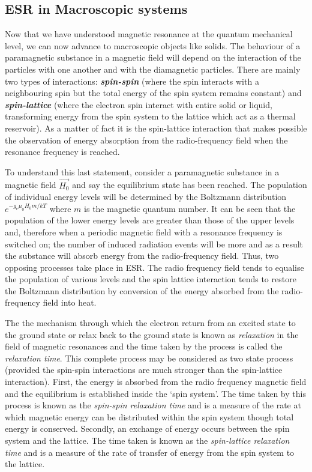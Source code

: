 \documentclass[%
 reprint,
nofootinbib,
 amsmath,amssymb,
 aps,
floatfix,
]{revtex4-2}
\begin{document}
    \subsection{ESR in Macroscopic systems}
    Now that we have understood magnetic resonance at the quantum mechanical level, we can now advance to macroscopic objects like solids. The behaviour of a paramagnetic substance in a magnetic field will depend on the interaction of the particles with one another and with the diamagnetic particles. There are mainly two types of interactions: \textbf{\textit{spin-spin}} (where the spin interacts with a neighbouring spin but the total energy of the spin system remains constant) and \textbf{\textit{spin-lattice}} (where the electron spin interact with entire solid or liquid, transforming energy from the spin system to the lattice which act as a thermal reservoir). As a matter of fact it is the spin-lattice interaction that makes possible the observation of energy absorption from the radio-frequency field when the resonance frequency is reached.
    \par
    To understand this last statement, consider a paramagnetic substance in a magnetic field $\Vec{H_0}$ and say the equilibrium state has been reached. The population of individual energy levels will be determined by the Boltzmann distribution $e^{-g_e \mu_0 H_0 m/ kT}$ where $m$ is the magnetic quantum number. It can be seen that the population of the lower energy levels are greater than those of the upper levels and, therefore when a periodic magnetic field with a resonance frequency is switched on; the number of induced radiation events will be more and as a result the substance will absorb energy from the radio-frequency field. Thus, two opposing processes take place in ESR. The radio frequency field tends to equalise the population of various levels and the spin lattice interaction tends to restore the Boltzmann distribution by conversion of the energy absorbed from the radio-frequency field into heat.
    \par
    The the mechanism through which the electron return from an excited state to the ground state or relax back to the ground state is known as \textit{relaxation} in the field of magnetic resonances  and the time taken by the process is called the \textit{relaxation time}. This complete process may be considered as two state process (provided the spin-spin interactions are much stronger than the spin-lattice interaction). First, the energy is absorbed from the radio frequency magnetic field and the equilibrium is established inside the `spin system'. The time taken by this process is known as the \textit{spin-spin relaxation time} and is a measure of the rate at which magnetic energy can be distributed within the spin system though total energy is conserved. Secondly, an exchange of energy occurs between the spin system and the lattice. The time taken is known as the \textit{spin-lattice relaxation time} and is a measure of the rate of transfer of energy from the spin system to the lattice.
\end{document}
